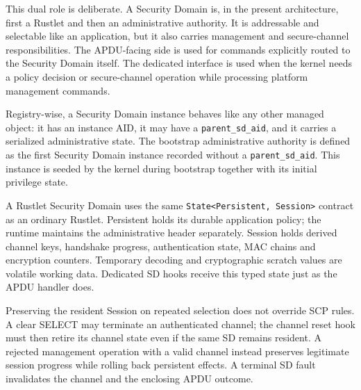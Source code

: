 This dual role is deliberate. A Security Domain is, in the present
architecture, first a Rustlet and then an administrative authority. It is
addressable and selectable like an application, but it also carries
management and secure-channel responsibilities. The APDU-facing side is
used for commands explicitly routed to the Security Domain itself. The
dedicated interface is used when the kernel needs a policy decision or
secure-channel operation while processing platform management commands.

Registry-wise, a Security Domain instance behaves like any other managed
object: it has an instance AID, it may have a \texttt{parent\_sd\_aid}, and it
carries a serialized administrative state. The bootstrap administrative
authority is defined as the first Security Domain instance recorded without a
\texttt{parent\_sd\_aid}. This instance is seeded by the kernel during
bootstrap together with its initial privilege state.

A Rustlet Security Domain uses the same \texttt{State<Persistent, Session>}
contract as an ordinary Rustlet. Persistent holds its durable application
policy; the runtime maintains the administrative header separately. Session
holds derived channel keys, handshake progress, authentication state, MAC
chains and encryption counters. Temporary decoding and cryptographic scratch
values are volatile working data. Dedicated SD hooks receive this typed state
just as the APDU handler does.

Preserving the resident Session on repeated selection does not override SCP
rules. A clear SELECT may terminate an authenticated channel; the channel
reset hook must then retire its channel state even if the same SD remains
resident. A rejected management operation with a valid channel instead
preserves legitimate session progress while rolling back persistent effects.
A terminal SD fault invalidates the channel and the enclosing APDU outcome.

